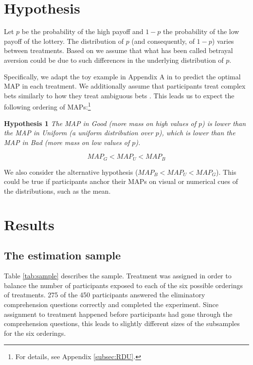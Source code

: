 \documentclass[pdftex,12pt, a4paper]{article}
\begin{document}
\section{Hypothesis}\label{sec:hyp}
Let $p$ be the probability of the high payoff and $1-p$ the probability of the low payoff of the lottery.
The distribution of $p$ (and consequently, of $1-p$) varies between treatments.
Based on \cite{Li2020a} we assume that what has been called betrayal aversion could be due to such differences in the underlying distribution of $p$.

Specifically, we adapt the toy example in Appendix A in \cite{Li2020a} to predict the optimal MAP in each treatment.
We additionally assume that participants treat complex bets similarly to how they treat ambiguous bets \cite[for supporting evidence, see][]{Armantier2016}.
This leads us to expect the following ordering of MAPs:\footnote{
For details, see Appendix \ref{subsec:RDU}.
}

\noindent \textbf{Hypothesis 1} \quad \textit{The MAP in Good (more mass on high values of $p$) is lower than the MAP in Uniform (a uniform distribution over $p$), which is lower than the MAP in Bad (more mass on low values of $p$).}

\begin{equation}
MAP_G < MAP_U < MAP_B
\end{equation}

We also consider the alternative hypothesis ($MAP_B < MAP_U < MAP_G$).
This could be true if participants anchor their MAPs on visual or numerical cues of the distributions, such as the mean.


\section{Results}\label{sec:results}
\subsection{The estimation sample}\label{ssec:sample}

Table \ref{tab:sample} describes the sample.
Treatment was assigned in order to balance the number of participants exposed to each of the six possible orderings of treatments.
275 of the 450 participants answered the eliminatory comprehension questions correctly and completed the experiment.
Since assignment to treatment happened before participants had gone through the comprehension questions, this leads to slightly different sizes of the subsamples for the six orderings.
\end{document}
